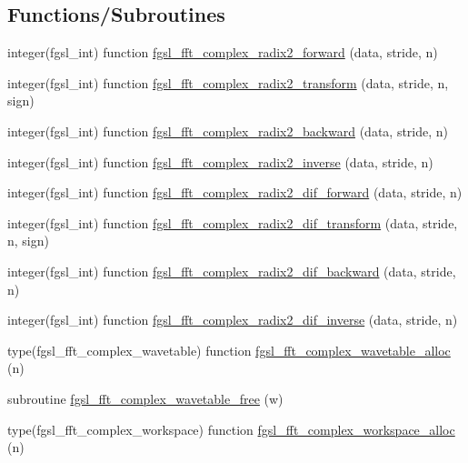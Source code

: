 \subsection*{Functions/\+Subroutines}
\begin{DoxyCompactItemize}
\item 
integer(fgsl\+\_\+int) function \hyperlink{fft_8finc_a6d6765aceb1cb89aa378e657277cb60e}{fgsl\+\_\+fft\+\_\+complex\+\_\+radix2\+\_\+forward} (data, stride, n)
\item 
integer(fgsl\+\_\+int) function \hyperlink{fft_8finc_adb683798dd4ccce52cc209e16deac0ab}{fgsl\+\_\+fft\+\_\+complex\+\_\+radix2\+\_\+transform} (data, stride, n, sign)
\item 
integer(fgsl\+\_\+int) function \hyperlink{fft_8finc_ac9dfd334102aed6b1833e9b6b936ee38}{fgsl\+\_\+fft\+\_\+complex\+\_\+radix2\+\_\+backward} (data, stride, n)
\item 
integer(fgsl\+\_\+int) function \hyperlink{fft_8finc_a2976591bd53bebb217c69c16b9cb36b4}{fgsl\+\_\+fft\+\_\+complex\+\_\+radix2\+\_\+inverse} (data, stride, n)
\item 
integer(fgsl\+\_\+int) function \hyperlink{fft_8finc_ab346147a5eba7237163db01403bd96e7}{fgsl\+\_\+fft\+\_\+complex\+\_\+radix2\+\_\+dif\+\_\+forward} (data, stride, n)
\item 
integer(fgsl\+\_\+int) function \hyperlink{fft_8finc_ae161490fa787f0b7b2d7aae171abb2fe}{fgsl\+\_\+fft\+\_\+complex\+\_\+radix2\+\_\+dif\+\_\+transform} (data, stride, n, sign)
\item 
integer(fgsl\+\_\+int) function \hyperlink{fft_8finc_a288d6bc95e5d5a7c2d0c0787ed77493a}{fgsl\+\_\+fft\+\_\+complex\+\_\+radix2\+\_\+dif\+\_\+backward} (data, stride, n)
\item 
integer(fgsl\+\_\+int) function \hyperlink{fft_8finc_aa5abc4b2da983c0197e3612ca15f700b}{fgsl\+\_\+fft\+\_\+complex\+\_\+radix2\+\_\+dif\+\_\+inverse} (data, stride, n)
\item 
type(fgsl\+\_\+fft\+\_\+complex\+\_\+wavetable) function \hyperlink{fft_8finc_afd1a11147328bddf936a7d414f796490}{fgsl\+\_\+fft\+\_\+complex\+\_\+wavetable\+\_\+alloc} (n)
\item 
subroutine \hyperlink{fft_8finc_a8b3b35a0490b49010d2f096a2117e1b0}{fgsl\+\_\+fft\+\_\+complex\+\_\+wavetable\+\_\+free} (w)
\item 
type(fgsl\+\_\+fft\+\_\+complex\+\_\+workspace) function \hyperlink{fft_8finc_a1ab14d22f845afbded031591ff898b56}{fgsl\+\_\+fft\+\_\+complex\+\_\+workspace\+\_\+alloc} (n)
\item 

\end{DoxyCompactItemize}
